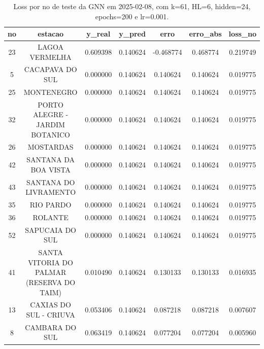 \begin{table}[h]
\centering
\caption{Loss por no de teste da GNN em 2025-02-08, com k=61, HL=6, hidden=24, epochs=200 e lr=0.001.}
\label{tab:gnn_loss_k61_hl6_h24_e200_d20250208}
\begin{tabular}{ccccccc}
\toprule
no & estacao & y\_real & y\_pred & erro & erro\_abs & loss\_no \\
\midrule
23 & LAGOA VERMELHA & 0.609398 & 0.140624 & -0.468774 & 0.468774 & 0.219749 \\
5 & CACAPAVA DO SUL & 0.000000 & 0.140624 & 0.140624 & 0.140624 & 0.019775 \\
25 & MONTENEGRO & 0.000000 & 0.140624 & 0.140624 & 0.140624 & 0.019775 \\
32 & PORTO ALEGRE - JARDIM BOTANICO & 0.000000 & 0.140624 & 0.140624 & 0.140624 & 0.019775 \\
26 & MOSTARDAS & 0.000000 & 0.140624 & 0.140624 & 0.140624 & 0.019775 \\
42 & SANTANA DA BOA VISTA & 0.000000 & 0.140624 & 0.140624 & 0.140624 & 0.019775 \\
43 & SANTANA DO LIVRAMENTO & 0.000000 & 0.140624 & 0.140624 & 0.140624 & 0.019775 \\
35 & RIO PARDO & 0.000000 & 0.140624 & 0.140624 & 0.140624 & 0.019775 \\
36 & ROLANTE & 0.000000 & 0.140624 & 0.140624 & 0.140624 & 0.019775 \\
52 & SAPUCAIA DO SUL & 0.000000 & 0.140624 & 0.140624 & 0.140624 & 0.019775 \\
41 & SANTA VITORIA DO PALMAR (RESERVA DO TAIM) & 0.010490 & 0.140624 & 0.130133 & 0.130133 & 0.016935 \\
13 & CAXIAS DO SUL - CRIUVA & 0.053406 & 0.140624 & 0.087218 & 0.087218 & 0.007607 \\
8 & CAMBARA DO SUL & 0.063419 & 0.140624 & 0.077204 & 0.077204 & 0.005960 \\
\bottomrule
\end{tabular}
\end{table}
